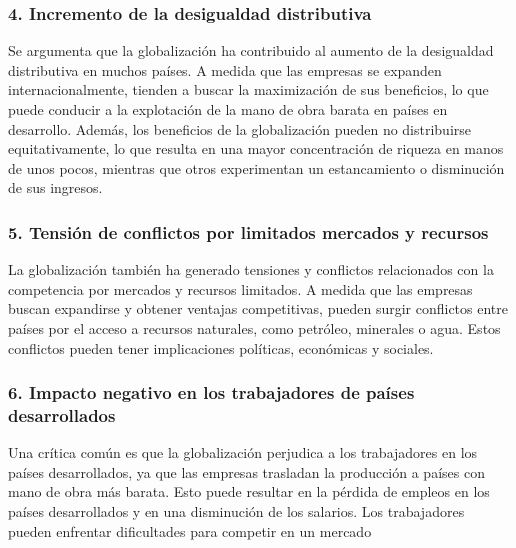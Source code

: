\documentclass[
  letterpaper,
  DIV=11,
  numbers=noendperiod]{scrartcl}
\begin{document}
\hypertarget{incremento-de-la-desigualdad-distributiva}{%
\subsubsection{4. Incremento de la desigualdad
distributiva}\label{incremento-de-la-desigualdad-distributiva}}

Se argumenta que la globalización ha contribuido al aumento de la
desigualdad distributiva en muchos países. A medida que las empresas se
expanden internacionalmente, tienden a buscar la maximización de sus
beneficios, lo que puede conducir a la explotación de la mano de obra
barata en países en desarrollo. Además, los beneficios de la
globalización pueden no distribuirse equitativamente, lo que resulta en
una mayor concentración de riqueza en manos de unos pocos, mientras que
otros experimentan un estancamiento o disminución de sus ingresos.

\hypertarget{tensiuxf3n-de-conflictos-por-limitados-mercados-y-recursos}{%
\subsubsection{5. Tensión de conflictos por limitados mercados y
recursos}\label{tensiuxf3n-de-conflictos-por-limitados-mercados-y-recursos}}

La globalización también ha generado tensiones y conflictos relacionados
con la competencia por mercados y recursos limitados. A medida que las
empresas buscan expandirse y obtener ventajas competitivas, pueden
surgir conflictos entre países por el acceso a recursos naturales, como
petróleo, minerales o agua. Estos conflictos pueden tener implicaciones
políticas, económicas y sociales.

\hypertarget{impacto-negativo-en-los-trabajadores-de-pauxedses-desarrollados}{%
\subsubsection{6. Impacto negativo en los trabajadores de países
desarrollados}\label{impacto-negativo-en-los-trabajadores-de-pauxedses-desarrollados}}

Una crítica común es que la globalización perjudica a los trabajadores
en los países desarrollados, ya que las empresas trasladan la producción
a países con mano de obra más barata. Esto puede resultar en la pérdida
de empleos en los países desarrollados y en una disminución de los
salarios. Los trabajadores pueden enfrentar dificultades para competir
en un mercado
\end{document}
